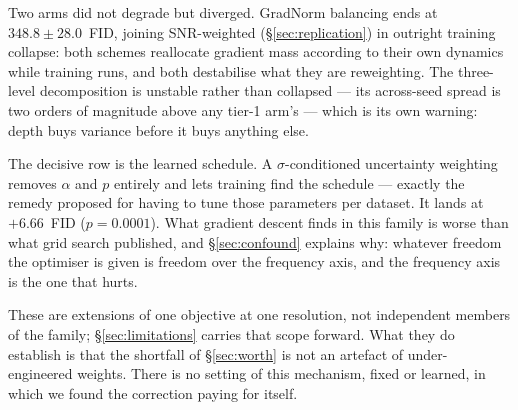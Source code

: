 Two arms did not degrade but diverged. GradNorm balancing ends at
$348.8 \pm 28.0$~FID, joining SNR-weighted (\S\ref{sec:replication}) in
outright training collapse: both schemes reallocate gradient mass according
to their own dynamics while training runs, and both destabilise what they
are reweighting. The three-level decomposition is unstable rather than
collapsed --- its across-seed spread is two orders of magnitude above any
tier-1 arm's --- which is its own warning: depth buys variance before it
buys anything else.

The decisive row is the learned schedule. A $\sigma$-conditioned uncertainty
weighting removes $\alpha$ and $p$ entirely and lets training find the
schedule --- exactly the remedy proposed for having to tune those parameters
per dataset. It lands at $+6.66$~FID ($p = 0.0001$). What gradient descent
finds in this family is worse than what grid search published, and
\S\ref{sec:confound} explains why: whatever freedom the optimiser is given
is freedom over the frequency axis, and the frequency axis is the one that
hurts.

These are extensions of one objective at one resolution, not independent
members of the family; \S\ref{sec:limitations} carries that scope forward.
What they do establish is that the shortfall of \S\ref{sec:worth} is not an
artefact of under-engineered weights. There is no setting of this mechanism,
fixed or learned, in which we found the correction paying for itself.
